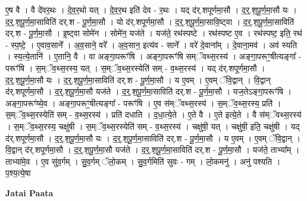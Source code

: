 \documentclass[17pt]{extarticle}
\begin{document}
ए॒ष वै । वै दे॑वर॒थः । दे॒व॒र॒थो यत् । दे॒व॒र॒थ इति॑ देव - र॒थः । यद् द॑र्.शपूर्णमा॒सौ । द॒र्॒.श॒पू॒र्ण॒मा॒सौ यः । द॒र्॒.श॒पू॒र्ण॒मा॒साविति॑ दर्.श - पू॒र्ण॒मा॒सौ । यो द॑र्.शपूर्णमा॒सौ । द॒र्॒.श॒पू॒र्ण॒मा॒सावि॒ष्ट्वा । द॒र्॒.श॒पू॒र्ण॒मा॒साविति॑ दर्.श - पू॒र्ण॒मा॒सौ । इ॒ष्ट्वा सोमे॑न । सोमे॑न॒ यज॑ते । यज॑ते॒ रथ॑स्पष्टे । रथ॑स्पष्ट ए॒व । रथ॑स्पष्ट॒ इति॒ रथ॑ - स्प॒ष्टे॒ । ए॒वाव॒साने᳚ । अ॒व॒साने॒ वरे᳚ । अ॒व॒सान॒ इत्य॑व - साने᳚ । वरे॑ दे॒वाना᳚म् । दे॒वाना॒मव॑ । अव॑ स्यति । स्य॒त्ये॒तानि॑ । ए॒तानि॒ वै । 
वा अङ्गा॒परूꣳ॑षि । अङ्गा॒परूꣳ॑षि सम्ॅवथ्स॒रस्य॑ । अङ्गा॒परूꣳ॒॒षीत्यङ्गा᳚ - परूꣳ॑षि । स॒म्ॅव॒थ्स॒रस्य॒ यत् । स॒म्ॅव॒थ्स॒रस्येति॑ सम् - व॒थ्स॒रस्य॑ । यद् द॑र्.शपूर्णमा॒सौ । द॒र्॒.श॒पू॒र्ण॒मा॒सौ यः । द॒र्॒.श॒पू॒र्ण॒मा॒साविति॑ दर्.श - पू॒र्ण॒मा॒सौ । य ए॒वम् । ए॒वम् ॅवि॒द्वान् । वि॒द्वान् द॑र्.शपूर्णमा॒सौ । द॒र्॒.श॒पू॒र्ण॒मा॒सौ यज॑ते । द॒र्॒.श॒पू॒र्ण॒मा॒साविति॑ दर्.श - पू॒र्ण॒मा॒सौ । यज॒तेऽङ्गा॒परूꣳ॑षि । अङ्गा॒परूꣳ॑ष्ये॒व । अङ्गा॒परूꣳ॒॒षीत्यङ्गा᳚ - परूꣳ॑षि । ए॒व स॑म्ॅवथ्स॒रस्य॑ । स॒म्ॅव॒थ्स॒रस्य॒ प्रति॑ । स॒म्ॅव॒थ्स॒रस्येति॑ सम् - व॒थ्स॒रस्य॑ । प्रति॑ दधाति । द॒धा॒त्ये॒ते । ए॒ते वै । ए॒ते इत्ये॒ते । वै स॑म्ॅवथ्स॒रस्य॑ । स॒म्ॅव॒थ्स॒रस्य॒ चक्षु॑षी । स॒म्ॅव॒थ्स॒रस्येति॑ सम् - व॒थ्स॒रस्य॑ । चक्षु॑षी॒ यत् । चक्षु॑षी॒ इति॒ चक्षु॑षी । यद् द॑र्.शपूर्णमा॒सौ । द॒र्॒.श॒पू॒र्ण॒मा॒सौ यः । द॒र्॒.श॒पू॒र्ण॒मा॒साविति॑ दर्.श - पू॒र्ण॒मा॒सौ । य ए॒वम् । ए॒वम् ॅवि॒द्वान् । वि॒द्वान् द॑र्.शपूर्णमा॒सौ । द॒र्॒.श॒पू॒र्ण॒मा॒सौ यज॑ते । द॒र्॒.श॒पू॒र्ण॒मा॒साविति॑ दर्.श - पू॒र्ण॒मा॒सौ । यज॑ते॒ ताभ्या᳚म् । ताभ्या॑मे॒व । ए॒व सु॑व॒र्गम् । सु॒व॒र्गम् ॅलो॒कम् । सु॒व॒र्गमिति॑ सुवः - गम् । लो॒कमनु॑ । अनु॑ पश्यति । प॒श्य॒त्ये॒षा \newline

\textbf{Jatai Paata} \newline
\end{document}
